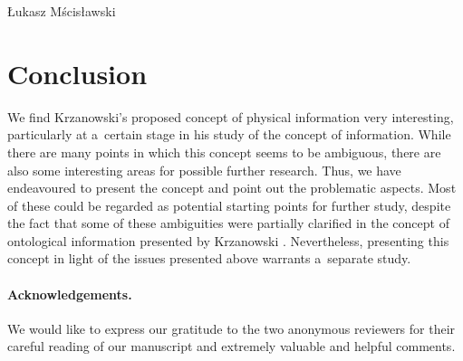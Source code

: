 \begin{artengenv}{Łukasz Mścisławski}
\section*{Conclusion}
We find Krzanowski's proposed concept of physical information very interesting, particularly at a~certain stage in his study of the concept of information. While there are many points in which this concept seems to be ambiguous, there are also some interesting areas for possible further research. Thus, we have endeavoured to present the concept and point out the problematic aspects. Most of these could be regarded as potential starting points for further study, despite the fact that some of these ambiguities were partially clarified in the concept of ontological information presented by Krzanowski
\parencite*[][]{krzanowski_ontological_2022}. %
 Nevertheless, presenting this concept in light of the issues presented above warrants a~separate study.

\paragraph{Acknowledgements.}
We would like to express our gratitude to the two anonymous reviewers for their careful reading of our manuscript and extremely valuable and helpful comments.

\end{artengenv}
\label{mscislaw_stop}
